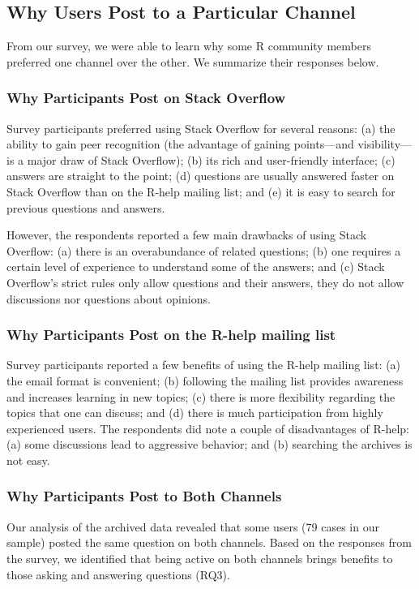 \documentclass[smallextended]{svjour3}       %
\newcommand{\SO}{Stack Overflow\xspace}
\newcommand{\RH}{R-help\xspace}
\begin{document}
\subsection{Why Users Post to a Particular Channel}
From our survey, we were able to learn why some R community members preferred one channel over the other. We summarize their responses below.

\subsubsection{Why Participants Post on \SO}

Survey participants preferred using \SO for several reasons: (a) the ability to gain peer recognition (the advantage of gaining points---and visibility---is a major draw of \SO); (b) its rich and user-friendly interface; (c) answers are straight to the point; (d) questions are usually answered faster on \SO than on the \RH mailing list; and (e) it is easy to search for previous questions and answers.

However, the respondents reported a few main drawbacks of using \SO: (a) there is an overabundance of related questions; (b) one requires a certain level of experience to understand some of the answers; and (c) \SO's strict rules only allow questions and their answers, they do not allow discussions nor questions about opinions.


\subsubsection{Why Participants Post on the \RH mailing list}
\label{sec:rh}

Survey participants reported a few benefits of using the \RH mailing list: (a) the email format is convenient; (b) following the mailing list provides awareness and increases learning in new topics; (c) there is more flexibility regarding the topics that one can discuss; and (d) there is much participation from highly experienced users. The respondents did note a couple of disadvantages of \RH: (a) some discussions lead to aggressive behavior; and (b) searching the archives is not easy.

\subsubsection{Why Participants Post to Both Channels}

Our analysis of the archived data revealed that some users (79 cases in our sample) posted the same question on both channels. 
Based on the responses from the survey, we identified that being active on both channels brings benefits to those asking and answering questions (RQ3).
\end{document}
